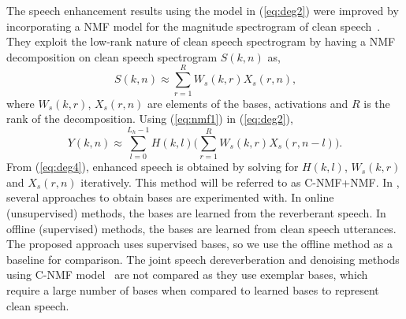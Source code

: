 The speech enhancement results using the model in (\ref{eq:deg2}) were improved by incorporating a NMF model for the magnitude spectrogram of clean speech~\cite{mohammadiha2016speech,Mohammadiha2015}.
They exploit the low-rank nature of clean speech spectrogram by having a NMF decomposition on clean speech spectrogram $S(k,n)$ as,
\begin{equation}
S(k,n)\approx\sum_{r=1}^R W_{s}(k,r)X_{s}(r,n)\text{,}
\label{eq:nmf1}
\end{equation}
where $W_{s}(k,r)$, $X_s(r,n)$ are elements of the bases, activations and $R$ is the rank of the decomposition. Using (\ref{eq:nmf1}) in (\ref{eq:deg2}),
\begin{equation}
Y(k,n) \approx \sum_{l=0}^{L_h-1}H(k,l)\bigg(\sum_{r=1}^R W_{s}(k,r)X_{s}(r,n-l)\bigg)\text{.}
\label{eq:deg4}
\end{equation}
From (\ref{eq:deg4}), enhanced speech is obtained by solving for $H(k,l)$, $W_{s}(k,r)$ and $X_{s}(r,n)$ iteratively. This method will be referred to as C-NMF+NMF. In \cite{mohammadiha2016speech,Mohammadiha2015}, several approaches to obtain bases are experimented with. In online (unsupervised) methods, the bases are learned from the reverberant speech. In offline (supervised) methods, the bases are learned from clean speech utterances. The proposed approach uses supervised bases, so we use the offline method as a baseline for comparison. The joint speech dereverberation and denoising methods using C-NMF model~\cite{baby2015coupled, baby2016phd, baby2017joint} are not compared as they use exemplar bases, which require a large number of bases when compared to learned bases to represent clean speech.   

